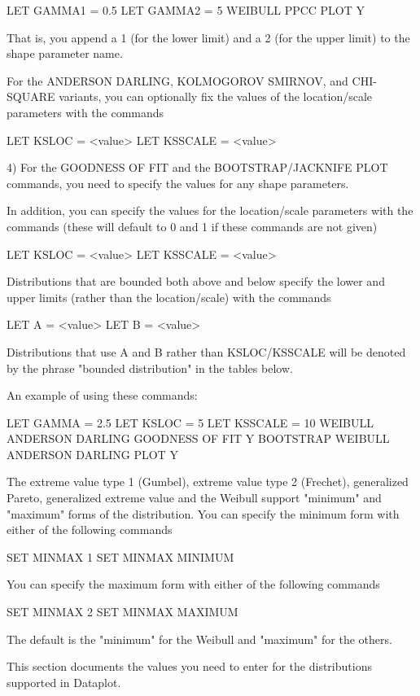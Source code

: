           LET GAMMA1 = 0.5
          LET GAMMA2 = 5
          WEIBULL PPCC PLOT Y

      That is, you append a 1 (for the lower limit) and a 2 (for the
      upper limit) to the shape parameter name.

      For the ANDERSON DARLING, KOLMOGOROV SMIRNOV, and CHI-SQUARE
      variants, you can optionally fix the values of the location/scale
      parameters with the commands

          LET KSLOC = <value>
          LET KSSCALE = <value>

   4) For the GOODNESS OF FIT and the BOOTSTRAP/JACKNIFE PLOT commands,
      you need to specify the values for any shape parameters.

      In addition, you can specify the values for the location/scale
      parameters with the commands (these will default to 0 and 1
      if these commands are not given)

          LET KSLOC = <value>
          LET KSSCALE = <value>

      Distributions that are bounded both above and below specify
      the lower and upper limits (rather than the location/scale)
      with the commands

          LET A = <value>
          LET B = <value>

      Distributions that use A and B rather than KSLOC/KSSCALE will
      be denoted by the phrase "bounded distribution" in the tables
      below.

      An example of using these commands:

          LET GAMMA = 2.5
          LET KSLOC = 5
          LET KSSCALE = 10
          WEIBULL ANDERSON DARLING GOODNESS OF FIT Y
          BOOTSTRAP WEIBULL ANDERSON DARLING PLOT Y

The extreme value type 1 (Gumbel), extreme value type 2 (Frechet),
generalized Pareto, generalized extreme value and the Weibull
support "minimum" and "maximum" forms of the distribution.  You
can specify the minimum form with either of the following commands

    SET MINMAX 1
    SET MINMAX MINIMUM

You can specify the maximum form with either of the following commands

    SET MINMAX 2
    SET MINMAX MAXIMUM

The default is the "minimum" for the Weibull and "maximum" for the
others.

This section documents the values you need to enter for the distributions
supported in Dataplot.

